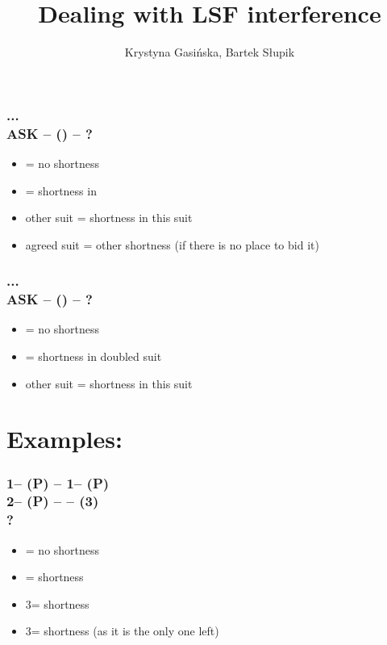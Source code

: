 \documentclass[12pt, a4paper]{article}
\title{Dealing with LSF interference}
\author{Krystyna Gasińska, Bartek Słupik}
\begin{document}
\maketitle


\subsubsection*{...\\{\color{WildStrawberry}\textbf{ASK}\color{black}} -- (\anysuit{\textbullet}) -- ?}
\begin{itemize}
    \item \dbl = no shortness
    \item \pass = shortness in \anysuit{\textbullet}
    \item other suit = shortness in this suit
    \item agreed suit = other shortness (if there is no place to bid it)
\end{itemize}

\subsubsection*{...\\{\color{WildStrawberry}\textbf{ASK}\color{black}} -- (\dbl) -- ?}
\begin{itemize}
    \item \rdbl = no shortness
    \item \pass = shortness in doubled suit
    \item other suit = shortness in this suit
\end{itemize}


\section*{Examples:}
\subsubsection*{1\minor -- (P) -- 1\hearts -- (P)\\
                2\hearts -- (P) -- \alrts{2\spades} -- (3\clubs)\\
                ?}
\begin{itemize}
    \item \dbl = no shortness
    \item \pass = \clubs shortness
    \item 3\diams = \diams shortness
    \item 3\hearts = \spades shortness (as it is the only one left)
\end{itemize}
\end{document}
